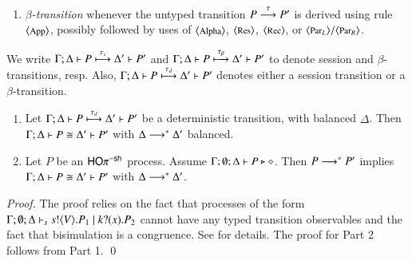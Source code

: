 {\begin{definition}
\begin{enumerate}[$-$]
		\item	{\em $\beta$-transition}
				whenever the untyped transition $P \stackrel{\tau}{\longrightarrow} P'$
				is derived using rule ${\footnotesize \langle \textrm{App} \rangle}$,
				possibly followed by uses of  ${\footnotesize \langle \textrm{Alpha} \rangle}$, ${\footnotesize \langle \textrm{Res} \rangle}$, ${\footnotesize \langle \textrm{Rec} \rangle}$, or ${\footnotesize \langle \textrm{Par${}_L$} \rangle}/
				{\footnotesize \langle \textrm{Par${}_R$} \rangle}$.
	\end{enumerate}
%
	We write
	$\Gamma; \Delta \vdash P \stackrel{\tau_{s}}{\longmapsto} \Delta' \vdash P'$
	and 
	$\Gamma; \Delta \vdash P \stackrel{\tau_{\beta}}{\longmapsto} \Delta' \vdash P'$
	to denote session and $\beta$-transitions, resp. Also, 
	 $\Gamma; \Delta \vdash P \stackrel{\tau_{d}}{\longmapsto} \Delta' \vdash P'$ denotes
	either a session transition or a $\beta$-transition.
\end{definition}
%

\begin{lemma}\rm
	\label{lem:tau_inert}
	\begin{enumerate}[1)]
		\item
				Let $\Gamma; \Delta \vdash P \stackrel{\tau_{d}}{\longmapsto} \Delta' \vdash P'$ be a deterministic transition,
				with balanced $\Delta$. Then 
				$\Gamma; \Delta \vdash P \cong \Delta'\vdash P'$ 
				with $\Delta \longrightarrow^\ast \Delta'$ balanced.

		\item 
				Let $P$ be an $\mathsf{HO}\pi^{-\mathsf{sh}}$ process. 
				Assume $\Gamma; \emptyset; \Delta \vdash P \triangleright \diamond$. Then 
				$P \longrightarrow^\ast P'$ implies $\Gamma; \Delta \vdash 
				P \cong \Delta'\vdash P'$ with $\Delta \longrightarrow^\ast \Delta'$. 
	\end{enumerate}
\end{lemma}


\begin{proof}
	The proof relies on the fact that processes of the
	form $\Gamma; \emptyset; \Delta \vdash_s s ! \langle V \rangle . P_1 \;|\; k ? (x) . P_2$
	cannot have any typed transition observables and the fact
	that bisimulation is a congruence.
	See   for details.
	The proof for Part 2 follows from Part 1.
	\qed
\end{proof}
}



